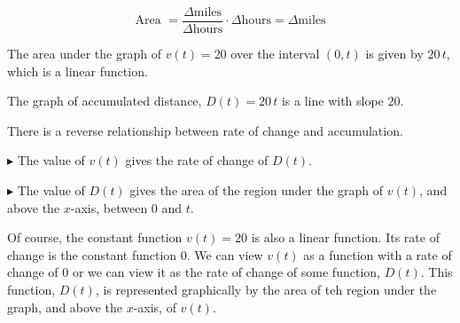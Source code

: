 \documentclass{ximera}
\begin{document}
\[
\text{Area } = \frac{\Delta \text{miles}}{\Delta \text{hours}} \cdot \Delta \text{hours} = \Delta \text{miles}
\]


The area under the graph of $v(t) = 20$ over the interval $(0, t)$ is given by $20 \, t$, which is a linear function.






The graph of accumulated distance, $D(t) = 20 \, t$ is a line with slope $20$.




\begin{image}
\end{image}
There is a reverse relationship between rate of change and accumulation. 


$\blacktriangleright$ The value of $v(t)$ gives the rate of change of $D(t)$.


$\blacktriangleright$ The value of $D(t)$ gives the area of the region under the graph of $v(t)$, and above the $x$-axis, between $0$ and $t$.






Of course, the constant function $v(t) = 20$ is also a linear function. Its rate of change is the constant function $0$.  We can view $v(t)$ as a function with a rate of change of $0$ or we can view it as the rate of change of some function, $D(t)$. This function, $D(t)$, is represented graphically by the area of teh region under the graph, and above the $x$-axis, of $v(t)$.
\end{document}
